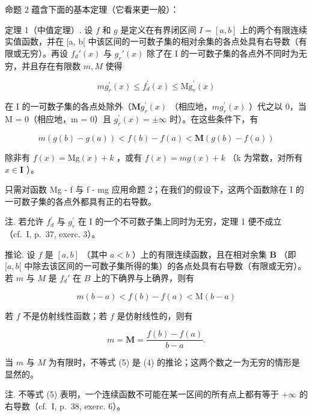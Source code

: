 命题 2 蕴含下面的基本定理（它看来更一般）：

定理 1（中值定理）. 设 \(f\) 和 \(g\) 是定义在有界闭区间 \(I = [a, b]\) 上的两个有限连续实值函数，并在 {[}a, b{[} 中该区间的一可数子集的相对余集的各点处具有右导数（有限或无穷）。再设 \(f_d'(x)\) 与 \(g_r'(x)\) 除了在 I 的一可数子集的各点外不同时为无穷，并且存在有限数 \(m, M\) 使得

\[
m g _ {r} ^ {\prime} (x) \leqslant f _ {d} ^ {\prime} (x) \leqslant \mathrm{Mg} _ {r} ^ {\prime} (x)\tag{3}
\]

在 I 的一可数子集的各点处除外（\(\mathbf{M}g_{r}^{\prime}(x)\) （相应地，\(mg_{r}^{\prime}(x)\) ）代之以 0，当 M = 0（相应地，m = 0）且 \(g_{r}^{\prime}(x) = \pm\infty\) 时）。在这些条件下，有

\[
m (g (b) - g (a)) <   f (b) - f (a) <   \mathbf {M} (g (b) - f (a))\tag{4}
\]

除非有 \(f(x) = \mathrm{Mg}(x) + k\) ，或有 \(f(x) = mg(x) + k\) （k 为常数，对所有 \(x \in \mathbf{I}\) ）。

只需对函数 Mg - f 与 f - mg 应用命题 2；在我们的假设下，这两个函数除在 I 的一可数子集的各点外都具有正的右导数。

注. 若允许 \(f_{d}^{\prime}\) 与 \(g_{r}^{\prime}\) 在 I 的一个不可数子集上同时为无穷，定理 1 便不成立（cf.~I, p.~37, exerc. 3）。

推论. 设 \(f\) 是 \([a, b]\) （其中 \(a < b\) ）上的有限连续函数，且在相对余集 \(\mathbf{B}\) （即 \([a, b[\) 中除去该区间的一可数子集所得的集）的各点处具有右导数（有限或无穷）。若 \(m\) 与 \(M\) 是 \(f_d'\) 在 \(B\) 上的下确界与上确界，则有

\[
m (b - a) <   f (b) - f (a) <   \mathrm{M} (b - a)\tag{5}
\]

若 \(f\) 不是仿射线性函数；若 \(f\) 是仿射线性的，则有

\[
m = \mathbf {M} = \frac {f (b) - f (a)}{b - a}.
\]

当 \(m\) 与 \(M\) 为有限时，不等式 (5) 是 (4) 的推论；这两个数之一为无穷的情形是显然的。

注. 不等式 (5) 表明，一个连续函数不可能在某一区间的所有点上都有等于 \(+\infty\) 的右导数（cf.~I, p.~38, exerc. 6）。

